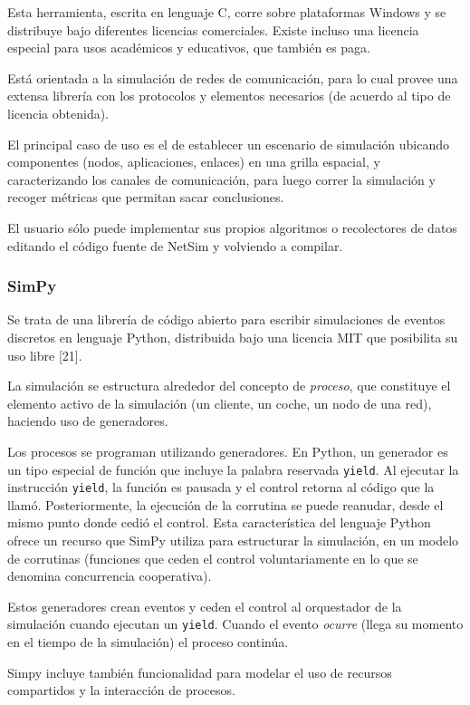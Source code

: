 \documentclass[]{article}
\begin{document}
Esta herramienta, escrita en lenguaje C, corre sobre plataformas Windows y se
distribuye bajo diferentes licencias comerciales. Existe incluso una licencia
especial para usos académicos y educativos, que también es paga.

Está orientada a la simulación de redes de comunicación, para lo cual provee
una extensa librería con los protocolos y elementos necesarios (de acuerdo al
tipo de licencia obtenida).

El principal caso de uso es el de establecer un escenario de simulación
ubicando componentes (nodos, aplicaciones, enlaces) en una grilla espacial, y
caracterizando los canales de comunicación, para luego correr la simulación y
recoger métricas que permitan sacar conclusiones.

El usuario sólo puede implementar sus propios algoritmos o recolectores de
datos editando el código fuente de NetSim y volviendo a compilar.

\subsubsection{SimPy}

Se trata de una librería de código abierto para escribir simulaciones de
eventos discretos en lenguaje Python, distribuida bajo una licencia MIT que
posibilita su uso libre [21].

La simulación se estructura alrededor del concepto de \textit{proceso}, que
constituye el elemento activo de la simulación (un cliente, un coche, un nodo
de una red), haciendo uso de generadores.

Los procesos se programan utilizando generadores.  En Python, un generador es
un tipo especial de función que incluye la palabra reservada \verb!yield!. Al
ejecutar la instrucción \verb!yield!, la función es pausada y el control
retorna al código que la llamó. Posteriormente, la ejecución de la corrutina se
puede reanudar, desde el mismo punto donde cedió el control. Esta
característica del lenguaje Python ofrece un recurso que SimPy utiliza para
estructurar la simulación, en un modelo de corrutinas (funciones que ceden el
control voluntariamente en lo que se denomina concurrencia cooperativa).

Estos generadores crean eventos y ceden el control al orquestador de la
simulación cuando ejecutan un \verb!yield!. Cuando el evento \textit{ocurre}
(llega su momento en el tiempo de la simulación) el proceso continúa.

Simpy incluye también funcionalidad para modelar el uso de recursos
compartidos y la interacción de procesos.
\end{document}
